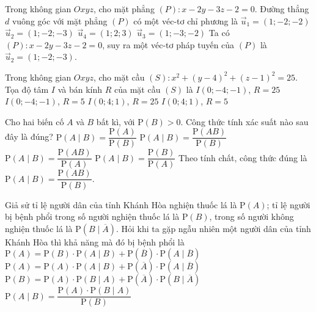 \begin{ex}%
Trong không gian $Oxyz$, cho mặt phẳng $(P)\colon x-2y-3z-2=0$. Đường thẳng $d$ vuông góc với mặt phẳng $(P)$ có một véc-tơ chỉ phương là
\choice
{$\overrightarrow{u}_{1}=(1;-2;-2)$}
{\True $\overrightarrow{u}_{2}=(1;-2;-3)$}
{$\overrightarrow{u}_{4}=(1;2;3)$}
{$\overrightarrow{u}_{3}=(1;-3;-2)$}
\loigiai
{
Ta có $(P)\colon x-2y-3z-2=0$, suy ra một véc-tơ pháp tuyến của $(P)$ là $\overrightarrow{u}_{2}=(1;-2;-3)$.
}
\end{ex}

\begin{ex}%
Trong không gian $Oxyz$, cho mặt cầu $(S)\colon x^2+(y-4)^2+(z-1)^2=25$. Tọa độ tâm $I$ và bán kính $R$ của mặt cầu $(S)$ là
\choice
{$I(0;-4;-1)$, $R=25$}
{$I(0;-4;-1)$, $R=5$}
{$I(0;4;1)$, $R=25$}
{\True $I(0;4;1)$, $R=5$}
\end{ex}

\begin{ex}%
Cho hai biến cố $A$ và $B$ bất kì, với $\mathrm{P}(B)>0$. Công thức tính xác suất nào sau đây là đúng?
\choice
{$\mathrm{P}(A\mid B)= \dfrac{\mathrm{P}(A)}{\mathrm{P}(B)}$}
{\True $\mathrm{P}(A\mid B)= \dfrac{\mathrm{P}(AB)}{\mathrm{P}(B)}$}
{$\mathrm{P}(A\mid B)= \dfrac{\mathrm{P}(AB)}{\mathrm{P}(A)}$}
{$\mathrm{P}(A\mid B)= \dfrac{\mathrm{P}(B)}{\mathrm{P}(A)}$}
\loigiai
{
Theo tính chất, công thức đúng là $\mathrm{P}(A\mid B)= \dfrac{\mathrm{P}(AB)}{\mathrm{P}(B)}$.
}
\end{ex}

\begin{ex}%
Giả sử tỉ lệ người dân của tỉnh Khánh Hòa nghiện thuốc lá là $\mathrm{P}(A)$; tỉ lệ người bị bệnh phổi
trong số người nghiện thuốc lá là $\mathrm{P}(B)$, trong số người không nghiện thuốc lá là $\mathrm{P}(B\mid \overline{A})$. Hỏi khi ta gặp ngẫu nhiên một người dân của tỉnh Khánh Hòa thì khả năng mà đó bị bệnh phổi là
\choice
{$\mathrm{P}(A)=\mathrm{P}(B)\cdot\mathrm{P}(A\mid B)+\mathrm{P}(\overline{B})\cdot\mathrm{P}(A\mid \overline{B})$}
{$\mathrm{P}(A)=\mathrm{P}(A)\cdot\mathrm{P}(A\mid B)+\mathrm{P}(\overline{A})\cdot\mathrm{P}(A\mid \overline{B})$}
{\True $\mathrm{P}(B)=\mathrm{P}(A)\cdot\mathrm{P}(B\mid A)+\mathrm{P}(\overline{A})\cdot\mathrm{P}(B\mid \overline{A})$}
{$\mathrm{P}(A\mid B)=\dfrac{\mathrm{P}(A)\cdot\mathrm{P}(B\mid A)}{\mathrm{P}(B)}$}
\end{ex}

